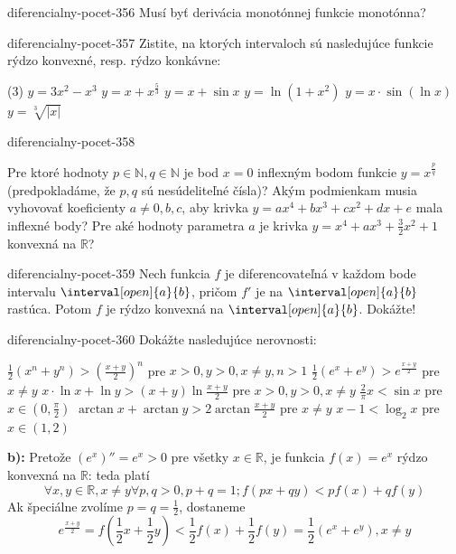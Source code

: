\begin{defproblem}{diferencialny-pocet-356}
Musí byť derivácia monotónnej funkcie monotónna?
\end{defproblem}

\begin{defproblem}{diferencialny-pocet-357}
Zistite, na ktorých intervaloch sú nasledujúce funkcie rýdzo konvexné, resp.
rýdzo konkávne:
\begin{tasks}(3)
  \task $y=3x^2-x^3$
  \task $y=x+x^{\frac{5}{3}}$
  \task $y=x+\sin x$
  \task $y=\ln (1+x^2)$
  \task $y=x\cdot\sin (\ln x)$
  \task $y=\sqrt[3]{|x|}$
\end{tasks}
\end{defproblem}

\begin{defproblem}{diferencialny-pocet-358}
\begin{tasks}
\task
  Pre ktoré hodnoty $p\in\mathbb{N},q\in\mathbb{N}$ je bod $x=0$ inflexným bodom
  funkcie $y=x^{\frac{p}{q}}$ (predpokladáme, že $p,q$ sú nesúdeliteľné čísla)?
\task
  Akým podmienkam musia vyhovovať koeficienty $a\neq 0,b,c$, aby krivka
  $y=ax^4+bx^3+cx^2+dx+e$ mala inflexné body?
\task
  Pre aké hodnoty parametra $a$ je krivka $y=x^4+ax^3+\frac{3}{2}x^2+1$ konvexná
  na $\mathbb{R}$?
\end{tasks}
\end{defproblem}

\begin{defproblem}{diferencialny-pocet-359}
Nech funkcia $f$ je diferencovateľná v každom bode intervalu
$\interval[open]{a}{b}$, pričom $f'$ je na $\interval[open]{a}{b}$ rastúca.
Potom $f$ je rýdzo konvexná na $\interval[open]{a}{b}$. Dokážte!
\end{defproblem}

\begin{defproblem}{diferencialny-pocet-360}
Dokážte nasledujúce nerovnosti:
\begin{tasks}
\task $\frac{1}{2}(x^n+y^n)>(\frac{x+y}{2})^n$ pre $x>0,y>0,x\neq y,n>1$
\task $\frac{1}{2}(e^x+e^y)>e^{\frac{x+y}{2}}$ pre $x\neq y$
\task $x\cdot\ln x+\ln y>(x+y)\ln \frac{x+y}{2}$ pre $x>0,y>0,x\neq y$
\task $\frac{2}{\pi}x<\sin x$ pre $x\in (0,\frac{\pi}{2})$
\task $\arctan x+\arctan y>2\arctan \frac{x+y}{2}$ pre $x\neq y$
\task $x-1<\log_2 x$ pre $x\in (1,2)$
\end{tasks}

\begin{solution}
  \textbf{b):}
  Pretože $(e^x)''=e^x>0$ pre všetky $x\in\mathbb{R}$, je funkcia $f(x)=e^x$
  rýdzo konvexná na $\mathbb{R}$: teda platí
  \[
    \forall x,y\in \mathbb{R},x\neq y \forall p,q>0,p+q=1;f(px+qy)<pf(x)+qf(y)
  \]
  Ak špeciálne zvolíme $p=q=\frac{1}{2}$, dostaneme
  \[
    e^{\frac{x+y}{2}}
    = f(\frac{1}{2}x+\frac{1}{2}y)<\frac{1}{2}f(x)+\frac{1}{2}f(y)
    = \frac{1}{2}(e^x+e^y), x\neq y
  \]
\end{solution}
\end{defproblem}

